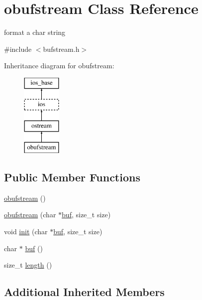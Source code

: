 \hypertarget{classobufstream}{\section{obufstream Class Reference}
\label{classobufstream}
}


format a char string  




{\ttfamily \#include $<$bufstream.\-h$>$}

Inheritance diagram for obufstream\-:\begin{figure}[H]
\begin{center}
\leavevmode
\includegraphics[height=4.000000cm]{classobufstream}
\end{center}
\end{figure}
\subsection*{Public Member Functions}
\begin{DoxyCompactItemize}
\item 
\hyperlink{classobufstream_aeb709cb9c7c89e9923f3c4bdf7047ad9}{obufstream} ()
\item 
\hyperlink{classobufstream_a1520a3e4f101c4b13bed5c054bdd5995}{obufstream} (char $\ast$\hyperlink{classobufstream_ae699be1c1ecede6f0fea1a9910f6ff59}{buf}, size\-\_\-t size)
\item 
void \hyperlink{classobufstream_ab972aca22a0039dc2870b7d91f1f5b4d}{init} (char $\ast$\hyperlink{classobufstream_ae699be1c1ecede6f0fea1a9910f6ff59}{buf}, size\-\_\-t size)
\item 
char $\ast$ \hyperlink{classobufstream_ae699be1c1ecede6f0fea1a9910f6ff59}{buf} ()
\item 
size\-\_\-t \hyperlink{classobufstream_a247bd0fb9923075af341c93f52ff7b9b}{length} ()
\end{DoxyCompactItemize}
\subsection*{Additional Inherited Members}


